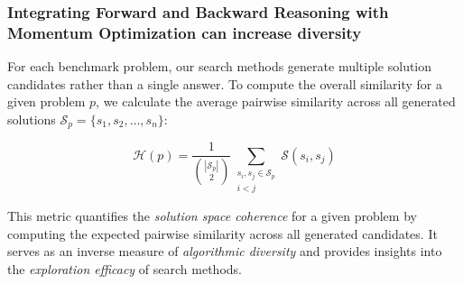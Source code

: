 \documentclass[11pt]{article}
\theoremstyle{definition}
\theoremstyle{remark}
\begin{document}
\subsubsection{Integrating Forward and Backward Reasoning with Momentum Optimization can increase diversity}

For each benchmark problem, our search methods generate multiple solution candidates rather than a single answer. To compute the overall similarity for a given problem $p$, we calculate the average pairwise similarity across all generated solutions $\mathcal{S}_p = \{s_1, s_2, \ldots, s_n\}$:


\begin{equation}
\mathcal{H}(p) = \frac{1}{\binom{|\mathcal{S}_p|}{2}} \sum_{\substack{s_i, s_j \in \mathcal{S}_p \\ i < j}} \mathcal{S}(s_i, s_j)
\end{equation}


This metric quantifies the \textit{solution space coherence} for a given problem by computing the expected pairwise similarity across all generated candidates. It serves as an inverse measure of \textit{algorithmic diversity} and provides insights into the \textit{exploration efficacy} of search methods.
\end{document}
